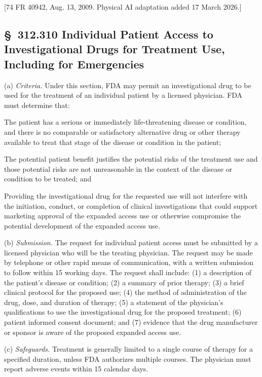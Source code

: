 [74 FR 40942, Aug. 13, 2009. Physical AI adaptation added 17 March 2026.]

\subsection{\S~312.310 Individual Patient Access to Investigational Drugs for Treatment Use, Including for Emergencies}

(a) \textit{Criteria.} Under this section, FDA may permit an investigational drug to be used for the treatment of an individual patient by a licensed physician. FDA must determine that:

\begin{description}[leftmargin=0.5cm,style=sameline]
\item[(1)] The patient has a serious or immediately life-threatening disease or condition, and there is no comparable or satisfactory alternative drug or other therapy available to treat that stage of the disease or condition in the patient;
\item[(2)] The potential patient benefit justifies the potential risks of the treatment use and those potential risks are not unreasonable in the context of the disease or condition to be treated; and
\item[(3)] Providing the investigational drug for the requested use will not interfere with the initiation, conduct, or completion of clinical investigations that could support marketing approval of the expanded access use or otherwise compromise the potential development of the expanded access use.
\end{description}

(b) \textit{Submission.} The request for individual patient access must be submitted by a licensed physician who will be the treating physician. The request may be made by telephone or other rapid means of communication, with a written submission to follow within 15 working days. The request shall include: (1) a description of the patient's disease or condition; (2) a summary of prior therapy; (3) a brief clinical protocol for the proposed use; (4) the method of administration of the drug, dose, and duration of therapy; (5) a statement of the physician's qualifications to use the investigational drug for the proposed treatment; (6) patient informed consent document; and (7) evidence that the drug manufacturer or sponsor is aware of the proposed expanded access use.

(c) \textit{Safeguards.} Treatment is generally limited to a single course of therapy for a specified duration, unless FDA authorizes multiple courses. The physician must report adverse events within 15 calendar days.

